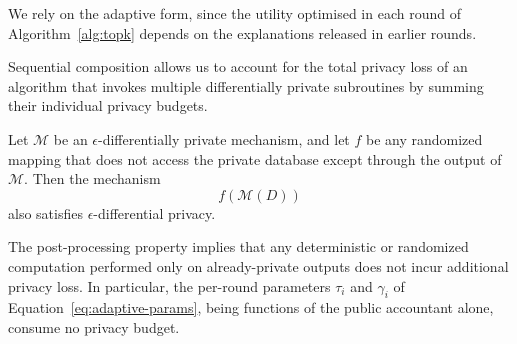 We rely on the adaptive form, since the utility optimised in each round of Algorithm~\ref{alg:topk} depends on the explanations released in earlier rounds.

Sequential composition allows us to account for the total privacy loss of an algorithm
that invokes multiple differentially private subroutines by summing their individual
privacy budgets.

\begin{theorem}
\label{thm:post-processing}
Let $\mathcal{M}$ be an $\epsilon$-differentially private mechanism,
and let $f$ be any randomized mapping that does not access the private database
except through the output of $\mathcal{M}$.
Then the mechanism
\[
f(\mathcal{M}(D))
\]
also satisfies $\epsilon$-differential privacy.
\end{theorem}

The post-processing property implies that any deterministic or randomized computation
performed only on already-private outputs does not incur additional privacy loss.
In particular, the per-round parameters $\tau_i$ and $\gamma_i$ of
Equation~\eqref{eq:adaptive-params}, being functions of the public accountant alone,
consume no privacy budget.

